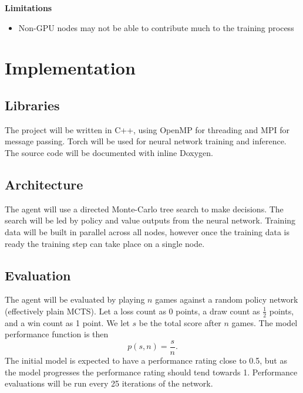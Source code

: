 \documentclass{article}
\begin{document}
\vspace{0.5cm}

\noindent\textbf{Limitations}
\begin{itemize}
    \item Non-GPU nodes may not be able to contribute much to the training process
\end{itemize}

\section{Implementation}

\subsection{Libraries}

The project will be written in C++, using OpenMP for threading and MPI for message passing. Torch will be used for neural network training and inference. The source code will be documented with inline Doxygen.

\subsection{Architecture}

The agent will use a directed Monte-Carlo tree search to make decisions. The search will be led by policy and value outputs from the neural network. Training data will be built in parallel across all nodes, however once the training data is ready the training step can take place on a single node. 

\subsection{Evaluation}

The agent will be evaluated by playing $n$ games against a random policy network (effectively plain MCTS). Let a loss count as 0 points, a draw count as $\tfrac{1}{2}$ points, and a win count as 1 point. We let $s$ be the total score after $n$ games. The model performance function is then
$$p(s, n) = \dfrac{s}{n}.$$
The initial model is expected to have a performance rating close to 0.5, but as the model progresses the performance rating should tend towards 1. Performance evaluations will be run every 25 iterations of the network.
\end{document}

